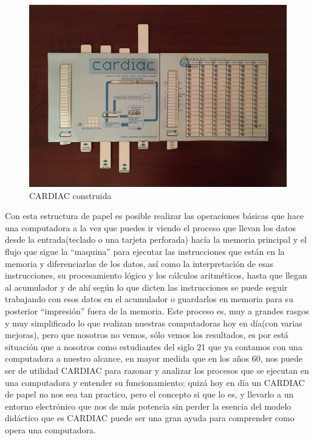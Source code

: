 \documentclass[letterpaper,12pt,oneside]{book}
\begin{document}
		\begin{figure}[h]
			\includegraphics[scale=0.3]{media/CARDIAC_Paper/Construida.jpg}
			\caption{CARDIAC construida}
			\label{fig:CARDIAC_Construida}
		\end{figure}
		
		
		Con esta estructura de papel es posible realizar las operaciones básicas que hace una computadora a la vez que puedes ir viendo el proceso que llevan
		los datos desde la entrada(teclado o una tarjeta perforada) hacía la memoria principal y el flujo que sigue la ``maquina'' para ejecutar
		las instrucciones que están en la memoria y diferenciarlas de los datos, así como la interpretación de esas instrucciones, su procesamiento lógico y los
		cálculos aritméticos, hasta que llegan al acumulador y de ahí según lo que dicten las instrucciones se puede seguir trabajando con
		esos datos en el acumulador o guardarlos en memoria para su posterior ``impresión'' fuera de la memoria. Este proceso es, muy a grandes rasgos y muy simplificado
		lo que realizan nuestras computadoras hoy en día(con varias mejoras), pero que nosotros no vemos, sólo vemos los resultados, es por está situación que a nosotros
		como estudiantes del siglo 21 que ya contamos con una computadora a nuestro alcance, en mayor medida que en los años 60, nos puede ser de utilidad
		CARDIAC para razonar y analizar los procesos que se ejecutan en una computadora y entender su funcionamiento; quizá hoy en día un CARDIAC de papel
		no nos sea tan practico, pero el concepto si que lo es, y llevarlo a un entorno electrónico que nos de más potencia sin perder la esencia del modelo
		didáctico que es
		CARDIAC puede ser una gran ayuda para comprender como opera una computadora.
\end{document}

